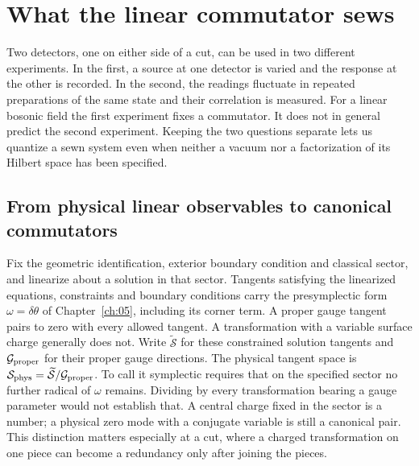 \chapter{What the linear commutator sews}\label{ch:11}
Two detectors, one on either side of a cut, can be used in two different
experiments. In the first, a source at one detector is varied and the
response at the other is recorded. In the second, the readings fluctuate in
repeated preparations of the same state and their correlation is measured.
For a linear bosonic field the first experiment fixes a commutator. It does
not in general predict the second experiment. Keeping the two questions
separate lets us quantize a sewn system even when neither a vacuum nor a
factorization of its Hilbert space has been specified.

\section{From physical linear observables to canonical commutators}
Fix the geometric identification, exterior boundary condition and classical
sector, and linearize about a solution in that sector. Tangents satisfying
the linearized equations, constraints and boundary conditions carry the
presymplectic form $\omega=\delta\theta$ of Chapter~\ref{ch:05}, including
its corner term. A proper gauge tangent pairs to zero with every allowed
tangent. A transformation with a variable surface charge generally does
not. Write $\widetilde{\mathcal S}$ for these constrained solution
tangents and $\mathcal G_{\rm proper}$ for their proper gauge directions.
The physical tangent space is $\mathcal S_{\rm phys}=
\widetilde{\mathcal S}/\mathcal G_{\rm proper}$. To call it symplectic
requires that on the specified sector no further radical of $\omega$
remains. Dividing by every transformation bearing a gauge parameter would
not establish that. A central charge fixed in the sector is a number; a
physical zero mode with a conjugate variable is still a canonical pair.
This distinction matters especially at a cut, where a charged transformation
on one piece can become a redundancy only after joining the pieces.

